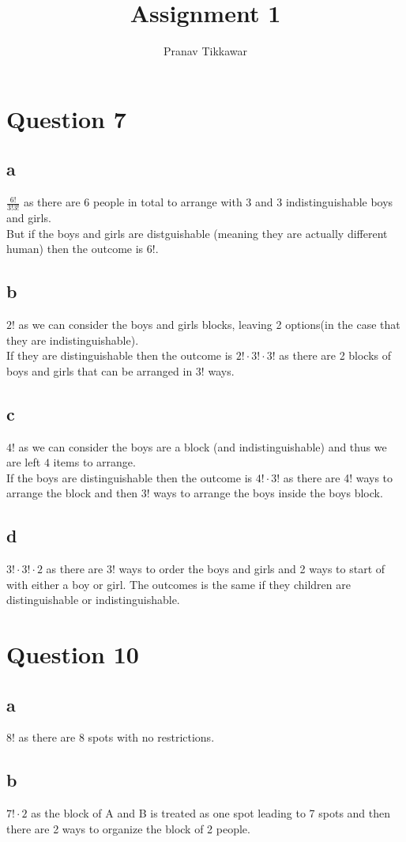 \documentclass{article}
\author{Pranav Tikkawar}
\title{Assignment 1}
\begin{document}
\maketitle
\section*{Question 7}
\subsection*{a}
$\frac{6!}{3!3!}$ as there are 6 people in total to arrange with 3 and 3 indistinguishable boys and girls.\\
But if the boys and girls are distguishable (meaning they are actually different human) then the outcome is $6!$.
\subsection*{b}
$2!$ as we can consider the boys and girls blocks, leaving 2 options(in the case that they are indistinguishable).\\
If they are distinguishable then the outcome is $2! \cdot 3! \cdot 3!$ as there are 2 blocks of boys and girls that can be arranged in $3!$ ways.  
\subsection*{c}
$4!$ as we can consider the boys are a block (and indistinguishable) and thus we are left $4$ items to arrange.\\
If the boys are distinguishable then the outcome is $4! \cdot 3!$ as there are 4! ways to arrange the block and then 3! ways to arrange the boys inside the boys block.
\subsection*{d}
$3! \cdot 3! \cdot 2$ as there are 3! ways to order the boys and girls and 2 ways to start of with either a boy or girl. The outcomes is the same if they children are distinguishable or indistinguishable.
\section*{Question 10}
\subsection*{a}
$8!$ as there are 8 spots with no restrictions.
\subsection*{b}
$7! \cdot 2$ as the block of A and B is treated as one spot leading to 7 spots and then there are 2 ways to organize the block of 2 people.
\end{document}
